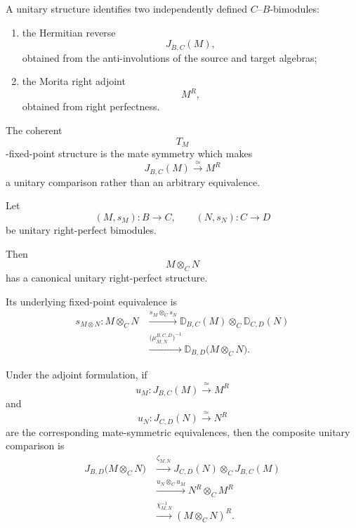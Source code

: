 \begin{remark}
\label{rem:unitary-identifies-duality-adjoint}
A unitary structure identifies two independently defined
$C$--$B$-bimodules:
\begin{enumerate}[label=(\roman*)]
    \item the Hermitian reverse
    \[
        J_{B,C}(M),
    \]
    obtained from the anti-involutions of the source and target
    algebras;

    \item the Morita right adjoint
    \[
        M^R,
    \]
    obtained from right perfectness.
\end{enumerate}

The coherent
\[
    T_M
\]
-fixed-point structure is the mate symmetry which makes
\[
    J_{B,C}(M)
    \xrightarrow{\;\simeq\;}
    M^R
\]
a unitary comparison rather than an arbitrary equivalence.
\end{remark}

\begin{theorem}
\label{thm:unitary-bimodule-composition}
Let
\[
    (M,s_M)
    \colon
    B
    \longrightarrow
    C,
    \qquad
    (N,s_N)
    \colon
    C
    \longrightarrow
    D
\]
be unitary right-perfect bimodules.

Then
\[
    M\otimes_CN
\]
has a canonical unitary right-perfect structure.

Its underlying fixed-point equivalence is
\[
\begin{aligned}
    s_{M\otimes N}
    \colon
    M\otimes_CN
    &\xrightarrow{
        s_M\otimes_Cs_N
    }
    \mathbb D_{B,C}(M)
    \otimes_C
    \mathbb D_{C,D}(N)
    \\
    &\xrightarrow{
        \bigl(
            \mu^{B,C,D}_{M,N}
        \bigr)^{-1}
    }
    \mathbb D_{B,D}
    \bigl(
        M\otimes_CN
    \bigr).
\end{aligned}
\]

Under the adjoint formulation, if
\[
    u_M
    \colon
    J_{B,C}(M)
    \xrightarrow{\;\simeq\;}
    M^R
\]
and
\[
    u_N
    \colon
    J_{C,D}(N)
    \xrightarrow{\;\simeq\;}
    N^R
\]
are the corresponding mate-symmetric equivalences, then the composite
unitary comparison is
\[
\begin{aligned}
    J_{B,D}
    \bigl(
        M\otimes_CN
    \bigr)
    &\xrightarrow{\zeta_{M,N}}
    J_{C,D}(N)
    \otimes_C
    J_{B,C}(M)
    \\
    &\xrightarrow{
        u_N\otimes_Cu_M
    }
    N^R\otimes_CM^R
    \\
    &\xrightarrow{
        \chi_{M,N}^{-1}
    }
    (M\otimes_CN)^R.
\end{aligned}
\]
\end{theorem}

